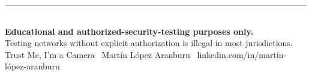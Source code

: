 \documentclass[11pt,a4paper]{article}
\begin{document}
\vspace{1.2cm}
\begin{center}
\rule{0.4\linewidth}{0.4pt}\\[6pt]
{\footnotesize\color{redc}\bfseries Educational and authorized-security-testing purposes only.}\\
{\footnotesize\color{inkfaint} Testing networks without explicit authorization is illegal in most jurisdictions.}\\[4pt]
{\footnotesize\color{inkfaint} Trust Me, I'm a Camera \textperiodcentered\ Mart\'in L\'opez Aranburu \textperiodcentered\ linkedin.com/in/mart\'in-l\'opez-aranburu}
\end{center}
\end{document}
